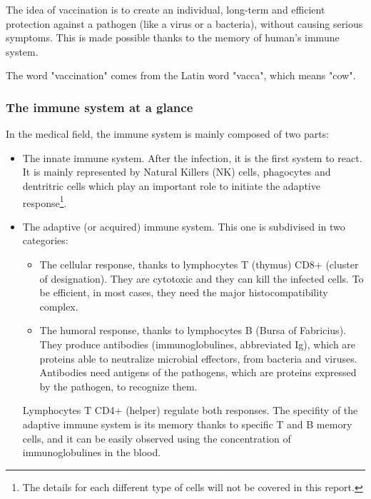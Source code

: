 \documentclass{article}
\begin{document}
            The idea of vaccination is to create an individual, long-term and efficient protection against a pathogen (like a virus or a bacteria), without causing serious symptoms.
            This is made possible thanks to the memory of human's immune system.

            The word "vaccination" comes from the Latin word "vacca", which means "cow".

            \subsubsection*{The immune system at a glance}

                In the medical field, the immune system is mainly composed of two parts:

                \begin{itemize}
                    \item The innate immune system. After the infection, it is the first system to react. It is mainly represented by Natural Killers (NK) cells,
                            phagocytes and dentritric cells which play an important role to initiate the adaptive response\footnote{The details for each different type 
                                of cells will not be covered in this report.}.
                    \item The adaptive (or acquired) immune system. This one is subdivised in two categories: 
                        \begin{itemize}
                            \item The cellular response, thanks to lymphocytes T (thymus) CD8+ (cluster of designation). They are cytotoxic and they can kill the infected cells.
                                    To be efficient, in most cases, they need the major histocompatibility complex.
                            \item The humoral response, thanks to lymphocytes B (Bursa of Fabricius). They produce antibodies (immunoglobulines, abbreviated Ig), which are proteins able to 
                                    neutralize microbial effectors, from bacteria and viruses. Antibodies need antigens of the pathogens, which are proteins expressed by the pathogen, to recognize them.
                        \end{itemize}
                        Lymphocytes T CD4+ (helper) regulate both responses.
                        The specifity of the adaptive immune system is its memory thanks to specific T and B memory cells, 
                            and it can be easily observed using the concentration of immunoglobulines in the blood.
                        

\end{itemize}
\end{document}

